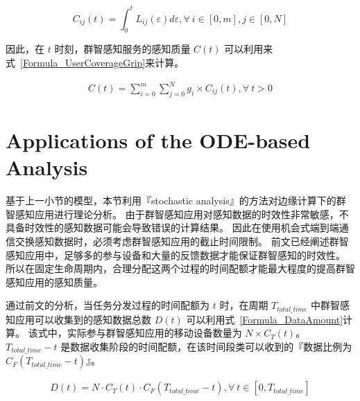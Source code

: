 \begin{equation}
  \label{Formula_UserTrace}
  C_{ij}(t) = \int_{0}^{t}L_{ij}(\varepsilon )d\varepsilon , \forall \ i \in [0,m], j \in [0,N]
\end{equation}

因此，在 $t$ 时刻，群智感知服务的感知质量 $C(t)$ 可以利用来式~\eqref{Formula_UserCoverageGrip}来计算。

\begin{equation}
  \label{Formula_UserCoverageGrip}
  \begin{gathered}
  C(t) = \sum^{m}_{i=0}\sum^{N}_{j=0} g_i \times C_{ij}(t), \forall \ t>0
  \end{gathered}
\end{equation}

\section{Applications of the ODE-based Analysis}

基于上一小节的模型，本节利用『stochastic analysis』的方法对边缘计算下的群智感知应用进行理论分析。
由于群智感知应用对感知数据的时效性非常敏感，不具备时效性的感知数据可能会导致错误的计算结果。
因此在使用机会式端到端通信交换感知数据时，必须考虑群智感知应用的截止时间限制。
前文已经阐述群智感知应用中，足够多的参与设备和大量的反馈数据才能保证群智感知的时效性。
所以在固定生命周期内，合理分配这两个过程的时间配额才能最大程度的提高群智感知应用的感知质量。

通过前文的分析，当任务分发过程的时间配额为 $t$ 时，在周期 $T_{total\_time}$ 中群智感知应用可以收集到的感知数据总数 $D(t)$ 可以利用式~\eqref{Formula_DataAmount}计算。
该式中，实际参与群智感知应用的移动设备数量为 $N\times C_T(t)$。
$T_{total\_time}-t$ 是数据收集阶段的时间配额，在该时间段类可以收到的『数据比例为 $C_F(T_{total\_time}-t)$』。

\begin{equation}
  \label{Formula_DataAmount}
  \begin{gathered}
  D(t) = N \cdot C_T(t) \cdot C_F(T_{total\_time}-t),\forall \ t \in [0, T_{total\_time}]
  \end{gathered}
\end{equation}


